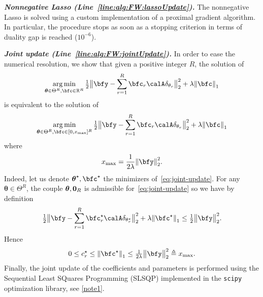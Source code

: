 \vspace*{1em}
\noindent
\textbf{\itshape Nonnegative Lasso (Line~\ref{line:alg:FW:lassoUpdate}).}
The nonnegative Lasso is solved using a custom implementation of a proximal gradient algorithm.
In particular, the procedure stops as soon as a stopping criterion in terms of duality gap is reached ($10^{-6}$).

\vspace*{1em}
\noindent
\textbf{\itshape Joint update (Line~\ref{line:alg:FW:jointUpdate}).}
In order to ease the numerical resolution, we show that given a positive integer $R$, the solution of
\begin{equation}
	\label{eq:joint-update}
	\kargmin_{\boldsymbol{\theta}\in\Theta^R,\bfc\in\kR^R} \tfrac{1}{2} \big\Vert{\bfy - \sum_{r=1}^R \bfc_r \opObs\spike{\theta_r}}\big\Vert_2^2 + \lambda\kvvbar{\bfc}_1
\end{equation}
is equivalent to the solution of
\begin{equation}
	\kargmin_{\boldsymbol{\theta}\in\Theta^R,\bfc\in[0, x_{\max}]^R} \tfrac{1}{2} \big\Vert{\bfy - \sum_{r=1}^R \bfc_r \opObs\spike{\theta_r}}\big\Vert_2^2 + \lambda\kvvbar{\bfc}_1
\end{equation}
where
\begin{equation}
	x_{\max} = \frac{1}{2\lambda} \kvvbar{\bfy}_2^2.
\end{equation}
Indeed, let us denote $\boldsymbol{\theta}^\star,\bfc^\star$ the minimizers of~\eqref{eq:joint-update}.
For any $\boldsymbol{\theta}\in\Theta^R$, the couple $\boldsymbol{\theta},\mathbf{0}_R$ is admissible for~\eqref{eq:joint-update} so we have by definition
\begin{equation}
	\tfrac{1}{2}\big\Vert{\bfy - \sum_{r=1}^R \bfc^\star_r \opObs\spike{\theta^\star_r}}\big\Vert_2^2 + \lambda\kvvbar{\bfc^\star}_1
	\leq
	\tfrac{1}{2} \big\Vert \bfy \big\Vert_2^2
	.
\end{equation}
Hence
\begin{equation}
	0 \leq c_r^\star \leq \kvvbar{\bfc^\star}_1 \leq \tfrac{1}{2\lambda} \big\Vert \bfy \big\Vert_2^2 \triangleq x_{\max}
		.
\end{equation}
Finally, the joint update of the coefficients and parameters is performed using the Sequential Least SQuares Programming (SLSQP) implemented in the \texttt{scipy} optimization library, see \cref{note1}.
